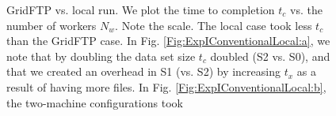 \documentclass{rspublic}
\begin{document}
\begin{figure}[!ht]
\begin{center}
\caption{GridFTP vs. local run. We plot the time to
completion $t_c$ vs. the number of workers $N_w$. Note the scale. The
local case took less $t_c$ than the GridFTP case. In Fig.
\ref{Fig:ExpIConventionalLocal:a}, we note that by doubling the data set
size $t_c$ doubled (S2 vs. S0), and that we created an overhead in S1 (vs. S2) by
increasing $t_x$ as a result of having more files. In Fig.
\ref{Fig:ExpIConventionalLocal:b}, the two-machine configurations took
}
\end{center}
\end{figure}
\end{document}
